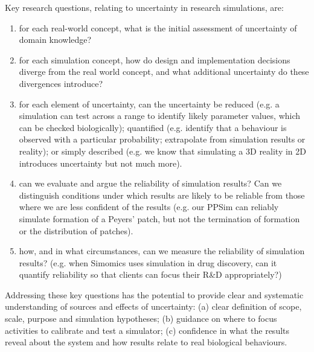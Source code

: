 \documentclass[sigconf,authordraft]{acmart}
\begin{document}
Key research questions, relating to uncertainty in research simulations, are:
\begin{enumerate}
\item for each real-world concept, what is the initial assessment of uncertainty of domain knowledge?
\item for each simulation concept, how do design and implementation decisions diverge from the real world concept, and what additional uncertainty do these divergences introduce?
\item for each element of uncertainty, can the uncertainty be reduced (e.g. a simulation can test across a range to identify likely parameter values, which can be checked biologically); quantified (e.g. identify that a behaviour is observed with a particular probability; extrapolate from simulation results or reality); or simply described (e.g. we know that simulating a 3D reality in 2D introduces uncertainty but not much more).
\item can we evaluate and argue the reliability of simulation results?  Can we distinguish conditions under which results are likely to be reliable from those where we are less confident of the results (e.g. our PPSim \cite{aldenPhD,sim-pp} can reliably simulate formation of a Peyers' patch, but not the termination of formation or the distribution of patches).
\item how, and in what circumstances, can we measure the reliability of simulation results?  (e.g. when Simomics uses simulation in drug discovery, can it quantify reliability so that clients can focus their R\&D appropriately?)
\end{enumerate}

Addressing these key questions has the potential to provide clear and systematic understanding of sources and effects of uncertainty: (a) clear definition of scope, scale, purpose and simulation hypotheses; 
(b) guidance on where to focus activities to calibrate and test a simulator; 
(c) confidence in what the results reveal about the system and how results relate to real biological behaviours.
\end{document}
